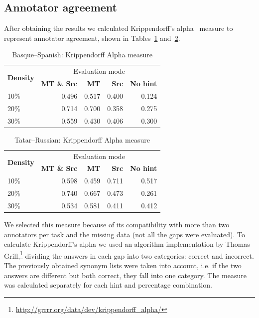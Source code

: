\documentclass[11pt]{article}
\begin{document}
\subsection{Annotator agreement}
After obtaining the results we calculated Krippendorff's alpha~\citep{krippendorff70} measure to represent annotator agreement, shown in Tables~\ref{table:alpha-eus-spa} and~\ref{table:alpha-tat-rus}. 
\begin{table}
\centering
  \begin{tabular}{|l|r|r|r|r|}
  \hline
 \multirow{2}{*}{\textbf{Density}} & \multicolumn{4}{|c|}{Evaluation mode} \\\cline{2-5}
                                            & \textbf{MT \& Src} & \textbf{MT} & \textbf{Src} & \textbf{No hint} \\
\hline
10\%&0.496&0.517&0.400&0.124\\
20\%&0.714&0.700&0.358&0.275\\
30\%&0.559&0.430&0.406&0.300\\

\hline
\end{tabular}
\caption {Basque--Spanish: Krippendorff Alpha measure} 
\label{table:alpha-eus-spa}
\end{table}

\begin{table}
\centering
  \begin{tabular}{|l|r|r|r|r|}
  \hline
 \multirow{2}{*}{\textbf{Density}} & \multicolumn{4}{|c|}{Evaluation mode} \\\cline{2-5}
                                            & \textbf{MT \& Src} & \textbf{MT} & \textbf{Src} & \textbf{No hint} \\
\hline
10\%&0.598&0.459 &0.711 &0.517 \\
20\%&0.740&0.667 &0.473 &0.261 \\
30\%&0.534&0.581 &0.411 &0.412 \\
\hline
\end{tabular}
\caption {Tatar--Russian: Krippendorff Alpha measure} 
\label{table:alpha-tat-rus}
\end{table}
We selected this measure because of its compatibility with more than two annotators per task and the missing data (not all the gaps were evaluated). To calculate Krippendorff's alpha we used an algorithm implementation by Thomas Grill,\footnote{\url{http://grrrr.org/data/dev/krippendorff_alpha/}} dividing the answers in each gap into two categories: correct and incorrect. The previously obtained synonym lists were taken into account, i.e. if the two answers are different but both correct, they fall into one category. The measure was calculated separately for each hint and percentage combination.
\end{document}

